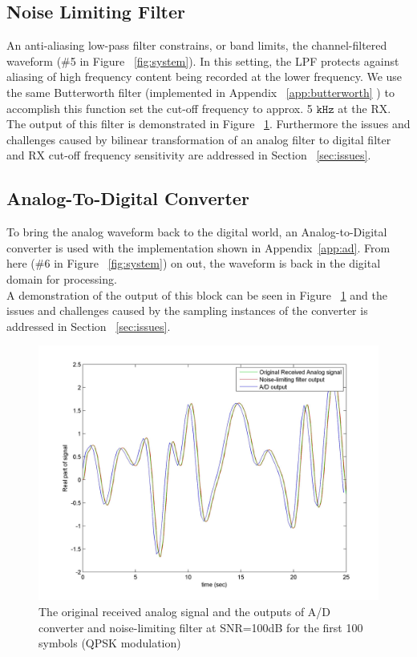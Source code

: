 \documentclass[]{article}
\begin{document}
\subsection{Noise Limiting Filter}
\label{sec:noiseLPF}
An anti-aliasing low-pass filter constrains, or band limits, the channel-filtered waveform (\#5 in Figure ~\ref{fig:system}).  In this setting, the LPF protects against aliasing of high frequency content being recorded at the lower frequency.  We use the same Butterworth filter (implemented in Appendix ~\ref{app:butterworth} ) to accomplish this function set the cut-off frequency to approx. 5 $\mathtt{kHz}$ at the RX. The output of this filter is demonstrated in Figure ~\ref{fig:atod}. Furthermore the issues and challenges caused by bilinear transformation of an analog filter to digital filter and RX cut-off frequency sensitivity are addressed in Section ~\ref{sec:issues}.

\subsection{Analog-To-Digital Converter}
\label{sec:adc}
To bring the analog waveform back to the digital world, an Analog-to-Digital converter is used with the implementation shown in Appendix~\ref{app:ad}.  From here (\#6 in Figure ~\ref{fig:system}) on out, the waveform is back in the digital domain for processing. \\

A demonstration of the output of this block can be seen in Figure ~\ref{fig:atod} and the issues and challenges caused by the sampling instances of the converter is addressed in Section ~\ref{sec:issues}.

	\begin{figure}[H]
	\centering
	\includegraphics[width=\textwidth]	{AtoD.jpg}
	\caption{The original received analog signal and the outputs of A/D converter and noise-limiting filter at SNR=100dB for the first 100 symbols (QPSK modulation)\label{fig:atod}}
	\end{figure}
\end{document}

